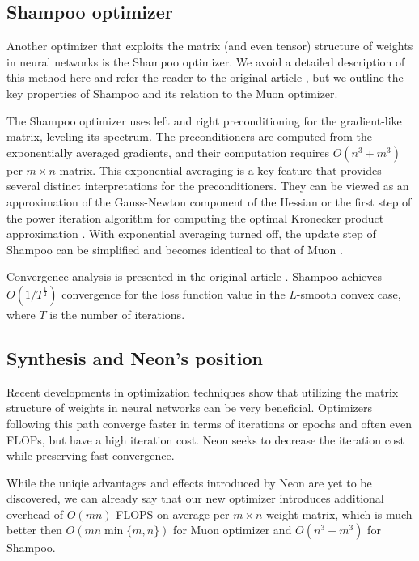 \documentclass{article} %
\begin{document}
\subsection{Shampoo optimizer}

Another optimizer that exploits the matrix (and even tensor) structure of weights in neural networks is the Shampoo optimizer. We avoid a detailed description of this method here and refer the reader to the original article \cite{gupta2018shampoopreconditionedstochastictensor}, but we outline the key properties of Shampoo and its relation to the Muon optimizer.

The Shampoo optimizer uses left and right preconditioning for the gradient-like matrix, leveling its spectrum. The preconditioners are computed from the exponentially averaged gradients, and their computation requires $O(n^3 + m^3)$ per $m \times n$ matrix. This exponential averaging is a key feature that provides several distinct interpretations for the preconditioners. They can be viewed as an approximation of the Gauss-Newton component of the Hessian or the first step of the power iteration algorithm for computing the optimal Kronecker product approximation \cite{morwani2025a}. With exponential averaging turned off, the update step of Shampoo can be simplified and becomes identical to that of Muon \cite{jordan2024muon}.

Convergence analysis is presented in the original article \cite{gupta2018shampoopreconditionedstochastictensor}. Shampoo achieves $O(1/T^{\frac{1}{2}})$ convergence for the loss function value in the $L$-smooth convex case, where $T$ is the number of iterations.

\subsection{Synthesis and Neon's position}

Recent developments in optimization techniques show that utilizing the matrix structure of weights in neural networks can be very beneficial. Optimizers following this path converge faster in terms of iterations or epochs and often even FLOPs, but have a high iteration cost. Neon seeks to decrease the iteration cost while preserving fast convergence.

While the uniqie advantages and effects introduced by Neon are yet to be discovered, we can already say that our new optimizer introduces additional overhead of $O(mn)$ FLOPS on average per $m \times n$ weight matrix, which is much better then $O(m n \min\{m, n\})$ for Muon optimizer and $O(n^3 + m^3)$ for Shampoo. 
\end{document}
